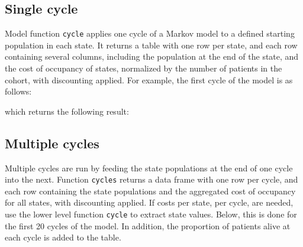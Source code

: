 \documentclass[
]{article}
\newenvironment{Shaded}{\begin{snugshade}}{\end{snugshade}}
\newcommand{\CommentTok}[1]{\textcolor[rgb]{0.56,0.35,0.01}{\textit{#1}}}
\begin{document}
\hypertarget{single-cycle}{%
\subsection{Single cycle}\label{single-cycle}}

Model function \texttt{cycle} applies one cycle of a Markov model to a
defined starting population in each state. It returns a table with one
row per state, and each row containing several columns, including the
population at the end of the state, and the cost of occupancy of states,
normalized by the number of patients in the cohort, with discounting
applied. For example, the first cycle of the model is as follows:

\begin{Shaded}
\end{Shaded}

which returns the following result:

\hypertarget{multiple-cycles}{%
\subsection{Multiple cycles}\label{multiple-cycles}}

Multiple cycles are run by feeding the state populations at the end of
one cycle into the next. Function \texttt{cycles} returns a data frame
with one row per cycle, and each row containing the state populations
and the aggregated cost of occupancy for all states, with discounting
applied. If costs per state, per cycle, are needed, use the lower level
function \texttt{cycle} to extract state values. Below, this is done for
the first 20 cycles of the model. In addition, the proportion of
patients alive at each cycle is added to the table.

\begin{Shaded}
\end{Shaded}
\end{document}
